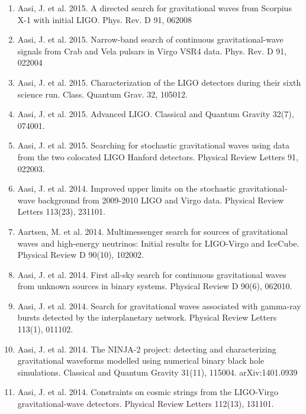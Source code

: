\documentclass[margin,line]{res}
\begin{document}
\begin{resume}
\begin{enumerate}
\item Aasi, J. et al. 2015. A directed search for gravitational waves from Scorpius X-1 with initial LIGO.  Phys. Rev. D 91, 062008

\item Aasi, J. et al. 2015. Narrow-band search of continuous gravitational-wave signals from Crab and Vela pulsars in Virgo VSR4 data.  Phys. Rev. D 91, 022004

\item Aasi, J. et al. 2015. Characterization of the LIGO detectors during their sixth science run. Class. Quantum Grav. 32, 105012.

\item Aasi, J. et al. 2015. Advanced LIGO. Classical and Quantum Gravity 32(7), 074001. 

\item Aasi, J. et al. 2015. Searching for stochastic gravitational waves using data from the two colocated LIGO Hanford detectors. Physical Review Letters 91, 022003. 

\item Aasi, J. et al. 2014. Improved upper limits on the stochastic gravitational-wave background from 2009-2010 LIGO and Virgo data. Physical Review Letters 113(23),  231101. 

\item Aartsen, M. et al. 2014. Multimessenger search for sources of gravitational waves and high-energy neutrinos: Initial results for LIGO-Virgo and IceCube. Physical Review D 90(10), 102002.

\item Aasi, J. et al. 2014. First all-sky search for continuous gravitational waves from unknown sources in binary systems. Physical Review D  90(6), 062010. 

\item Aasi, J. et al. 2014. Search for gravitational waves associated with gamma-ray bursts detected by the interplanetary network. Physical Review Letters 113(1), 011102. 

\item Aasi, J. et al. 2014. The NINJA-2 project: detecting and characterizing gravitational waveforms modelled using numerical binary black hole simulations. Classical and Quantum Gravity 31(11),  115004.  arXiv:1401.0939

\item Aasi, J. et al. 2014. Constraints on cosmic strings from the LIGO-Virgo gravitational-wave detectors. Physical Review Letters 112(13), 131101. 


\end{enumerate}
\end{resume}
\end{document}
